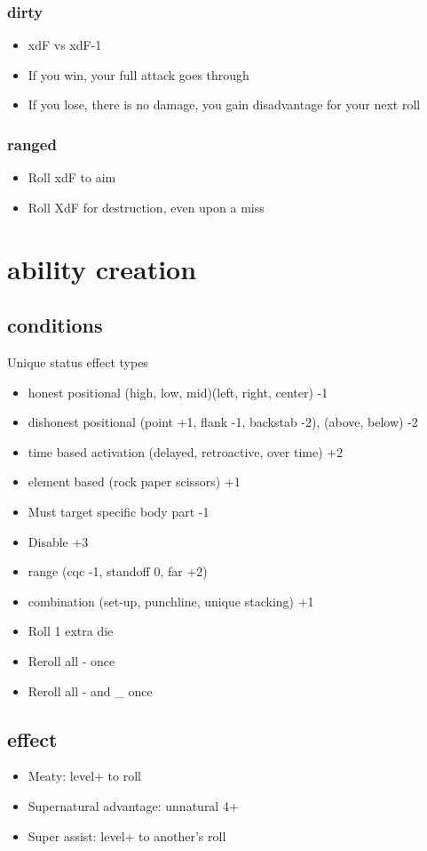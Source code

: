 \documentclass[10pt,letterpaper]{article}
\begin{document}
	\subsubsection{dirty}
	\begin{itemize}
		\item  xdF vs xdF-1
		\item  If you win, your full attack goes through
		\item  If you lose, there is no damage, you gain disadvantage for your next roll
	\end{itemize}
	\subsubsection{ranged}
	\begin{itemize}
		\item  Roll xdF to aim
		\item  Roll XdF for destruction, even upon a miss
	\end{itemize}
	\section{ability creation}
	\subsection{conditions}
	Unique status effect types 
	\begin{itemize}
		\item honest positional (high, low, mid)(left, right, center) -1
		\item dishonest positional (point +1, flank -1, backstab -2), (above, below) -2
		\item time based activation (delayed, retroactive, over time) +2
		\item element based (rock paper scissors) +1
		\item Must target specific body part -1
		\item Disable +3
		\item range (cqc -1, standoff 0, far +2)
		\item combination (set-up, punchline, unique stacking) +1
		
		\item Roll 1 extra die
		\item Reroll all - once
		\item Reroll all - and \_ once
	\end{itemize}
	
	\subsection{effect}
	\begin{itemize}
		\item  Meaty: level+ to roll
		\item  Supernatural advantage: unnatural 4+
		\item  Super assist: level+ to another's roll
	\end{itemize}
	
	
	
\end{document}
